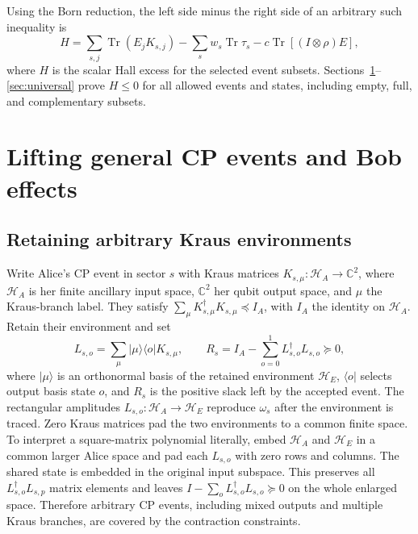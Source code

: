 \documentclass[11pt]{article}
\newcommand{\Tr}{\operatorname{Tr}}
\begin{document}
Using the Born reduction, the left side minus the right side of an arbitrary such inequality is
\begin{equation}
 H=\sum_{s,j}\Tr(E_jK_{s,j})
       -\sum_s w_s\Tr\tau_s-c\Tr[(I\otimes\rho)E],
 \label{eq:Hall-score}
\end{equation}
where $H$ is the scalar Hall excess for the selected event subsets. Sections~\ref{sec:lifting}--\ref{sec:universal} prove $H\le0$ for all allowed events and states, including empty, full, and complementary subsets.

\section{Lifting general CP events and Bob effects}
\label{sec:lifting}
\subsection{Retaining arbitrary Kraus environments}
Write Alice's CP event in sector $s$ with Kraus matrices $K_{s,\mu}:\mathcal H_A\to\mathbb C^2$, where $\mathcal H_A$ is her finite ancillary input space, $\mathbb C^2$ her qubit output space, and $\mu$ the Kraus-branch label. They satisfy $\sum_\mu K_{s,\mu}^\dagger K_{s,\mu}\preceq I_A$, with $I_A$ the identity on $\mathcal H_A$. Retain their environment and set
\begin{equation}
 L_{s,o}=\sum_\mu|\mu\rangle\langle o|K_{s,\mu},\qquad
 R_s=I_A-\sum_{o=0}^1L_{s,o}^\dagger L_{s,o}\succeq0,
 \label{eq:Alice-contraction}
\end{equation}
where $|\mu\rangle$ is an orthonormal basis of the retained environment $\mathcal H_E$, $\langle o|$ selects output basis state $o$, and $R_s$ is the positive slack left by the accepted event. The rectangular amplitudes $L_{s,o}:\mathcal H_A\to\mathcal H_E$ reproduce $\omega_s$ after the environment is traced. Zero Kraus matrices pad the two environments to a common finite space. To interpret a square-matrix polynomial literally, embed $\mathcal H_A$ and $\mathcal H_E$ in a common larger Alice space and pad each $L_{s,o}$ with zero rows and columns. The shared state is embedded in the original input subspace. This preserves all $L_{s,o}^\dagger L_{s,p}$ matrix elements and leaves $I-\sum_oL_{s,o}^\dagger L_{s,o}\succeq0$ on the whole enlarged space. Therefore arbitrary CP events, including mixed outputs and multiple Kraus branches, are covered by the contraction constraints.
\end{document}

